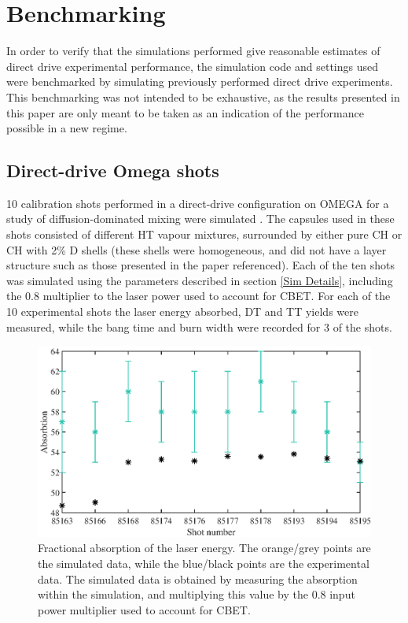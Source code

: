 \chapter{\label{app:benchmark} Benchmarking}

\minitoc

In order to verify that the simulations performed give reasonable estimates of direct drive experimental performance, the simulation code and settings used were benchmarked by simulating previously performed direct drive experiments. This benchmarking was not intended to be exhaustive, as the results presented in this paper are only meant to be taken as an indication of the performance possible in a new regime.

\section{Direct-drive Omega shots}

10 calibration shots performed in a direct-drive configuration on OMEGA for a study of diffusion-dominated mixing were simulated \cite{Zylstra2018a}. The capsules used in these shots consisted of different HT vapour mixtures, surrounded by either pure CH or CH with 2\% D shells (these shells were homogeneous, and did not have a layer structure such as those presented in the paper referenced). Each of the ten shots was simulated using the parameters described in section \ref{Sim Details}, including the 0.8 multiplier to the laser power used to account for CBET. For each of the 10 experimental shots the laser energy absorbed, DT and TT yields were measured, while the bang time and burn width were recorded for 3 of the shots.

\begin{figure}[ht]
\centering
\includegraphics{figures/LowCR/BenchmarkOmegaAbsorbtion.eps}
\caption{Fractional absorption of the laser energy. The orange/grey points are the simulated data, while the blue/black points are the experimental data. The simulated data is obtained by measuring the absorption within the simulation, and multiplying this value by the 0.8 input power multiplier used to account for CBET.}
\label{fig:OmegaAbs}
\end{figure}

